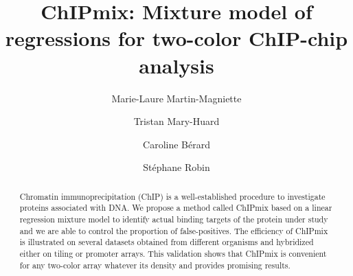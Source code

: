 \documentclass{llncs}
\begin{document}
\frontmatter          %
\pagestyle{headings}  %

\title{ChIPmix: Mixture model of regressions for two-color ChIP-chip analysis}
 \author{Marie-Laure
  Martin-Magniette\and Tristan Mary-Huard \and
  Caroline B\'erard \and St\'ephane Robin}


\maketitle

\begin{abstract}
  Chromatin immunoprecipitation (ChIP) is a well-established procedure
  to investigate proteins associated with DNA. We propose a
  method called ChIPmix based on a linear regression mixture model to identify
  actual binding targets of the protein under study and we are able to
  control the proportion of false-positives. The efficiency of ChIPmix is
  illustrated on several datasets obtained from different organisms and hybridized
  either on tiling or promoter arrays. This validation shows that
  ChIPmix is convenient for any two-color array  whatever its density and provides promising results.
\end{abstract}
\end{document}
